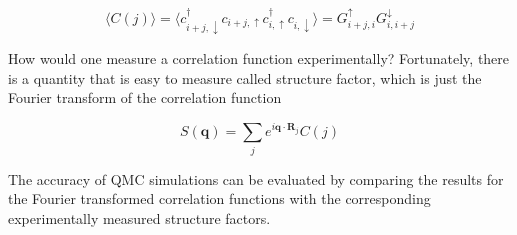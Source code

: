 \begin{equation}
\big\langle C(j) \big\rangle = \big\langle c_{i+j, \downarrow}^\dagger c_{i+j, \uparrow} c_{i, \uparrow}^\dagger c_{i, \downarrow} \big\rangle = G_{i+j, i}^\uparrow G_{i, i + j}^\downarrow
\end{equation}

How would one measure a correlation function experimentally? Fortunately, there is a quantity that is easy to measure called structure factor, which is just the Fourier transform of the correlation function

\begin{equation}
S(\bm q) = \sum_j e^{i\bm q \cdot \bm R_j} C(j) 
\end{equation}

The accuracy of QMC simulations can be evaluated by comparing the results for the Fourier transformed correlation functions with the corresponding experimentally measured structure factors.